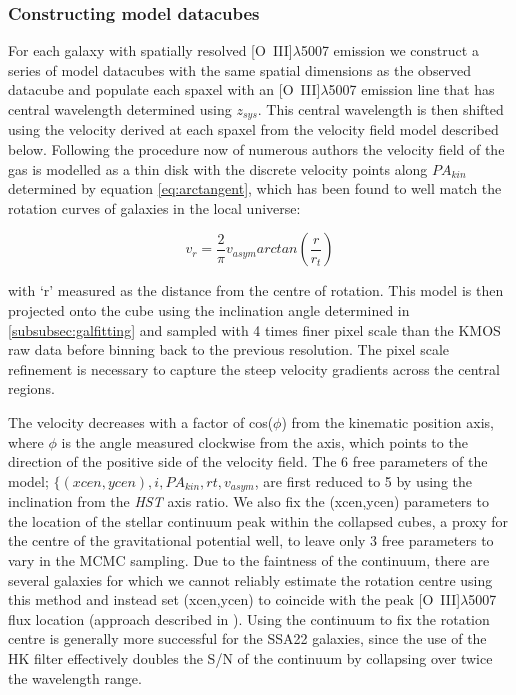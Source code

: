 \documentclass[fleqn,usenatbib]{mn2e}
\begin{document}
\subsubsection{Constructing model datacubes}\label{subsubec:model_cube}
For each galaxy with spatially resolved [O~{\sc III}]$\lambda$5007 emission we construct a series of model datacubes with the same spatial dimensions as the observed datacube and populate each spaxel with an [O~{\sc III}]$\lambda$5007 emission line that has central wavelength determined using $z_{sys}$.
This central wavelength is then shifted using the velocity derived at each spaxel from the velocity field model described below.  
Following the procedure now of numerous authors \citep[e.g.][]{Epinat2010,Epinat2012,Swinbank2012,Stott2016,Mason2016} the velocity field of the gas is modelled as a thin disk with the discrete velocity points along $PA_{kin}$ determined by equation \ref{eq:arctangent}, which has been found to well match the rotation curves of galaxies in the local universe:

\begin{equation}\label{eq:arctangent}
   v_{r} = \frac{2}{\pi}v_{asym}arctan\left(\frac{r}{r_{t}}\right)
\end{equation}

\noindent
with `r' measured as the distance from the centre of rotation.
This model is then projected onto the cube using the inclination angle determined in \cref{subsubsec:galfitting} and sampled with 4 times finer pixel scale than the KMOS raw data before binning back to the previous resolution.
The pixel scale refinement is necessary to capture the steep velocity gradients across the central regions.

The velocity decreases with a factor of cos($\phi$) from the kinematic position axis, where $\phi$ is the angle measured clockwise from the axis, which points to the direction of the positive side of the velocity field.
The 6 free parameters of the model; $\{(xcen, ycen), i, PA_{kin}, rt, v_{asym}$, are first reduced to 5 by using the inclination from the {\em HST} axis ratio.
We also fix the (xcen,ycen) parameters to the location of the stellar continuum peak within the collapsed cubes, a proxy for the centre of the gravitational potential well, to leave only 3 free parameters to vary in the MCMC sampling.
Due to the faintness of the continuum, there are several galaxies for which we cannot reliably estimate the rotation centre using this method and instead set (xcen,ycen) to coincide with the peak [O~{\sc III}]$\lambda$5007 flux location (approach described in \citealt{Harrison2017}).
Using the continuum to fix the rotation centre is generally more successful for the SSA22 galaxies, since the use of the HK filter effectively doubles the S/N of the continuum by collapsing over twice the wavelength range. \\
\end{document}
